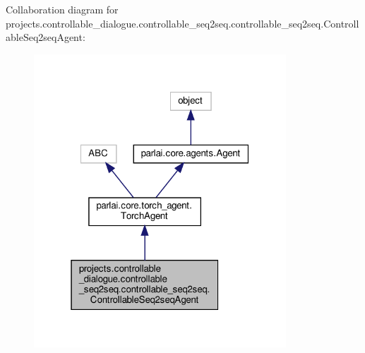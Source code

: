 Collaboration diagram for projects.\+controllable\+\_\+dialogue.\+controllable\+\_\+seq2seq.\+controllable\+\_\+seq2seq.\+Controllable\+Seq2seq\+Agent\+:
\nopagebreak
\begin{figure}[H]
\begin{center}
\leavevmode
\includegraphics[width=268pt]{de/d6e/classprojects_1_1controllable__dialogue_1_1controllable__seq2seq_1_1controllable__seq2seq_1_1Con19d93f1a2a924e8b6c8b2d9d045183f4}
\end{center}
\end{figure}
